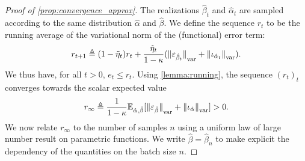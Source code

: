 \begin{proof}[Proof of \autoref{prop:convergence_approx}]
The realizations $\hat \beta_t$ and $\hat \alpha_t$
are sampled according to the same distribution $\hat \alpha$ and $\hat \beta$. We
define the sequence $r_t$ to be the running average of the variational norm of the
(functional) error term:
\begin{equation}
    r_{t+1} \triangleq (1 - \tilde \eta_t) r_t + \frac{\tilde \eta_t}{1 - \kappa}
    ({\Vert \varepsilon_{\hat \beta_t} \Vert}_{\text{\upshape var}} + 
    {\Vert \iota_{\hat \alpha_t} \Vert}_{\text{\upshape var}}).
\end{equation}
We thus have, for all $t > 0$, $e_t \leq r_t$. Using \autoref{lemma:running}, the sequence $(r_t)_t$
converges towards the scalar expected value
\begin{equation}\label{eq:r_infty}
    r_\infty \triangleq \frac{1}{1 - \kappa} \mathbb{E}_{\hat \alpha, \hat \beta}[{\Vert \varepsilon_{\hat \beta} \Vert}_{\text{\upshape var}}
    + {\Vert \iota_{\hat \alpha} \Vert}_{\text{\upshape var}}] > 0.
\end{equation}
We now relate $r_\infty$ to the number of samples $n$ using
a uniform law of large number result on parametric functions.
We write $\hat \beta = \hat \beta_n$ to make explicit the dependency of the
quantities on the batch size $n$.


\end{proof}
